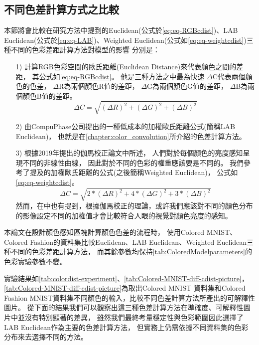 \documentclass[class=NCU\_thesis, crop=false]{standalone}
\begin{document}
    \subsection{不同色差計算方式之比較}
    \label{chapter:diff-colordist-compare}
    本節將會比較在研究方法中提到的Euclidean(公式於\cref{eq:eq-RGBcdist})、LAB Euclidean(公式於\cref{eq:eq-LAB})、Weighted Euclidean(公式如\cref{eq:eq-weightcdist})三種不同的色彩差距計算方法對模型的影響
    分別是：
    \begin{itemize}
      \item [1)] 
        計算RGB色彩空間的歐氏距離(Euclidean Distance)來代表顏色之間的差距，
        其公式如\cref{eq:eq-RGBcdist}。
        他是三種方法之中最為快速
        $\Delta$C代表兩個顏色的色差，
        $\Delta$R為兩個顏色R值的差距，
        $\Delta$G為兩個顏色G值的差距，
        $\Delta$B為兩個顏色B值的差距。
        \begin{equation}
        \label{eq:eq-RGBcdist}
            \Delta C = \sqrt{(\Delta R)^2 + (\Delta G)^2 + (\Delta B)^2}
        \end{equation}

      \item [2)]
        由CompuPhase公司提出的一種低成本的加權歐氏距離公式\cite{LABformula}(簡稱LAB Euclidean)，
        也就是在\cref{chapter:color_convolution}所介紹的色差計算方法。

      \item [3)]
        根據2019年提出的伽馬校正論文\cite{GammaCorrection}中所述，
        人們對於每個顏色的亮度感知呈現不同的非線性曲線，
        因此對於不同的色彩的權重應該要是不同的。
        我們參考了\cite{LABformula}提及的加權歐氏距離的公式(之後簡稱Weighted Euclidean)，
        公式如\cref{eq:eq-weightcdist}。
        \begin{equation}
        \label{eq:eq-weightcdist}
            \Delta C = \sqrt{2 * (\Delta R)^2 + 4 * (\Delta G)^2 + 3 * (\Delta B)^2}
        \end{equation}
        然而，在\cite{LABformula}中也有提到，根據伽馬校正的理論，或許我們應該對不同的顏色分布的影像設定不同的加權值才會比較符合人眼的視覺對顏色亮度的感知。
    \end{itemize}

    本論文在設計顏色感知區塊計算顏色色差的流程時，
    使用Colored MNIST、Colored Fashion的資料集比較Euclidean、LAB Euclidean、Weighted Euclidean三種不同的色彩差距計算方法，
    而其餘參數均保持\cref{tab:ColoredModelparameters}的色彩實驗參數不變。

	實驗結果如\cref{tab:colordist-experiment}、\cref{tab:Colored-MNIST-diff-cdist-picture}，
    \cref{tab:Colored-MNIST-diff-cdist-picture}為取出Colored MNIST 資料集和Colored Fashion MNIST資料集不同顏色的輸入，比較不同色差計算方法所產出的可解釋性圖片。
	從下面的結果我們可以觀察出這三種色差計算方法在準確度、可解釋性圖片中並沒有特別顯著的差異，
	雖然我們最終考量穩定性與色彩範圍因此選擇了LAB Euclidean作為主要的色差計算方法，
    但實務上仍需依據不同資料集的色彩分布來去選擇不同的方法。
\end{document}

